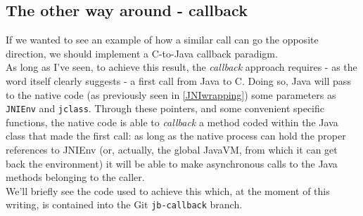 \subsection{The other way around - callback}
\label{callbackSection}
If we wanted to see an example of how a similar call can go the opposite direction, we should implement a C-to-Java callback paradigm.\\
As long as I've seen, to achieve this result, the \textit{callback} approach requires - as the word itself clearly suggests - a first call from Java to C. Doing so, Java will pass to the native code (as previously seen in \ref{JNIwrapping}) some parameters as \texttt{JNIEnv} and \texttt{jclass}. Through these pointers, and some convenient specific functions, the native code is able to \textit{callback} a method coded within the Java class that made the first call: as long as the native process can hold the proper references to JNIEnv (or, actually, the global JavaVM, from which it can get back the environment) it will be able to make asynchronous calls to the Java methods belonging to the caller.\\
We'll briefly see the code used to achieve this which, at the moment of this writing, is contained into the Git \texttt{jb-callback} branch.
